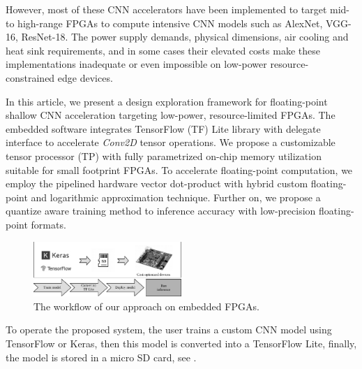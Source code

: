 However, most of these CNN accelerators have been implemented to target mid- to high-range FPGAs to compute intensive CNN models such as AlexNet, VGG-16, ResNet-18. The power supply demands, physical dimensions, air cooling and heat sink requirements, and in some cases their elevated costs make these implementations inadequate or even impossible  on low-power resource-constrained edge devices.



In this article, we present a design exploration framework for floating-point shallow CNN acceleration targeting low-power, resource-limited FPGAs. The embedded software integrates TensorFlow (TF) Lite library with delegate interface to accelerate \emph{Conv2D} tensor operations. We propose a customizable tensor processor (TP) with fully parametrized on-chip memory utilization suitable for small footprint FPGAs. To accelerate floating-point computation, we employ the pipelined hardware vector dot-product with hybrid custom floating-point and logarithmic approximation technique\cite{nevarez2021accelerating}. Further on, we propose a quantize aware training method to  inference accuracy with low-precision floating-point formats.

\begin{figure}[t!]
	\centering
	\includegraphics[width=0.5\textwidth]{../figures/workflow.pdf}
	\caption{The workflow of our approach on embedded FPGAs.}
	\label{fig:workflow}
\end{figure}

To operate the proposed system, the user trains a custom CNN model using TensorFlow or Keras, then this model is converted into a TensorFlow Lite, finally, the model is stored in a micro SD card, see .

